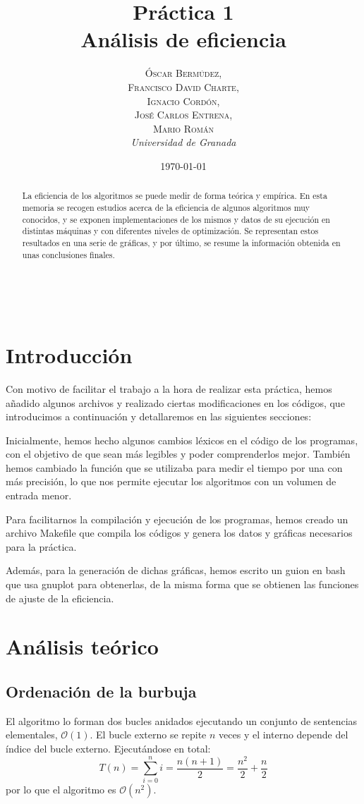 \documentclass[a4paper, 11pt]{article} %
\title{\textbf{Práctica 1}\\ %
Análisis de eficiencia} %
\author{\textsc{Óscar Bermúdez,\\Francisco David Charte,\\Ignacio Cordón,\\José Carlos Entrena,\\Mario Román} %
\\{\textit{Universidad de Granada}}} %
\date{\today} %
\makeatletter
\renewcommand{\maketitle}{ %
\begin{flushright} %
{\LARGE\@title} %

\vspace{50pt} %

{\large\@author} %
\\\@date %

\vspace{40pt} %
\end{flushright}
}
\makeatother
\begin{document}
\maketitle %

\renewcommand{\abstractname}{Resumen} %
\begin{abstract}
La eficiencia de los algoritmos se puede medir de forma teórica 
y empírica. En esta memoria se recogen estudios acerca de la 
eficiencia de algunos algoritmos muy conocidos, y se exponen 
implementaciones de los mismos y datos de su ejecución en 
distintas máquinas y con diferentes niveles de optimización.
Se representan estos resultados en una serie de gráficas, y por 
último, se resume la información obtenida en unas conclusiones 
finales.
\end{abstract}
\tableofcontents

\pagebreak

\section {Introducción}
Con motivo de facilitar el trabajo a la hora de realizar esta práctica,
hemos añadido algunos archivos y realizado ciertas modificaciones en los códigos, que
introducimos a continuación y detallaremos en las siguientes secciones: 

\medskip
Inicialmente, hemos hecho algunos cambios léxicos en el código de los programas, con el
objetivo de que sean más legibles y poder comprenderlos mejor. También hemos
cambiado la función que se utilizaba para medir el tiempo por una con más precisión, lo 
que nos permite ejecutar los algoritmos con un volumen de entrada menor. 

Para facilitarnos la compilación y ejecución de los programas, hemos creado un archivo 
Makefile que compila los códigos y genera los datos y gráficas necesarios para la práctica.

Además, para la generación de dichas gráficas, hemos escrito un guion en bash que usa gnuplot 
para obtenerlas, de la misma forma que se obtienen las funciones de ajuste de la eficiencia. 

\section {Análisis teórico}
\subsection {Ordenación de la burbuja}
El algoritmo lo forman dos bucles anidados ejecutando un conjunto de sentencias elementales, $\mathcal{O}(1)$.
El bucle externo se repite $n$ veces y el interno depende del índice del bucle externo. Ejecutándose en total:
\begin{equation}
 T(n) = \sum_{i=0}^n i = \frac{n(n+1)}{2} = \frac{n^2}{2} + \frac{n}{2}
\end{equation}
por lo que el algoritmo es $\mathcal{O}(n^2)$.
\end{document}

